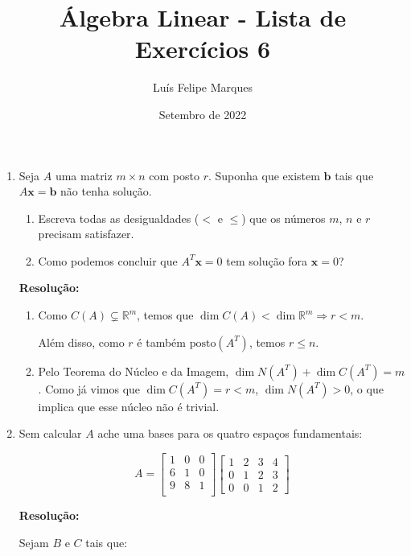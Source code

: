 \documentclass[leqno]{article}
\title{Álgebra Linear - Lista de Exercícios 6}
\author{Luís Felipe Marques}
\date{Setembro de 2022}
\newcommand{\pst}[1]{\text{posto}(#1)}
\begin{document}
 
\maketitle

\begin{enumerate}
    \item Seja $A$ uma matriz $m\times n$ com posto $r$. Suponha que existem $\textbf{b}$ tais que $A\textbf{x}=\textbf{b}$ não tenha solução.
    
    \begin{enumerate}
        \item Escreva todas as desigualdades ($<$ e $\leq$) que os números $m$, $n$ e $r$ precisam satisfazer.
        
        \item Como podemos concluir que $A^T\textbf{x}=0$ tem solução fora $\textbf{x}=0$?
    \end{enumerate}
    
    \textbf{Resolução:}

    \begin{enumerate}
        \item Como $C(A)\subsetneq \mathbb{R}^m$, temos que $\dim C(A)<\dim \mathbb{R}^m\Rightarrow r<m$.
        
        Além disso, como $r$ é também $\pst{A^T}$, temos $r\leq n$.
        
        \item Pelo Teorema do Núcleo e da Imagem, $\dim N(A^T)+\dim C(A^T)=m$. Como já vimos que $\dim C(A^T)=r<m$, $\dim N(A^T)>0$, o que implica que esse núcleo não é trivial.
    \end{enumerate}
    
    \item Sem calcular $A$ ache uma bases para os quatro espaços fundamentais:
    
    $$A=\begin{bmatrix}
    1 & 0 & 0\\
    6 & 1 & 0\\
    9 & 8 & 1\\
    \end{bmatrix}\begin{bmatrix}
    1 & 2 & 3 & 4\\
    0 & 1 & 2 & 3\\
    0 & 0 & 1 & 2
    \end{bmatrix}$$
    
    \textbf{Resolução:}

    Sejam $B$ e $C$ tais que:
    

\end{enumerate}
\end{document}
